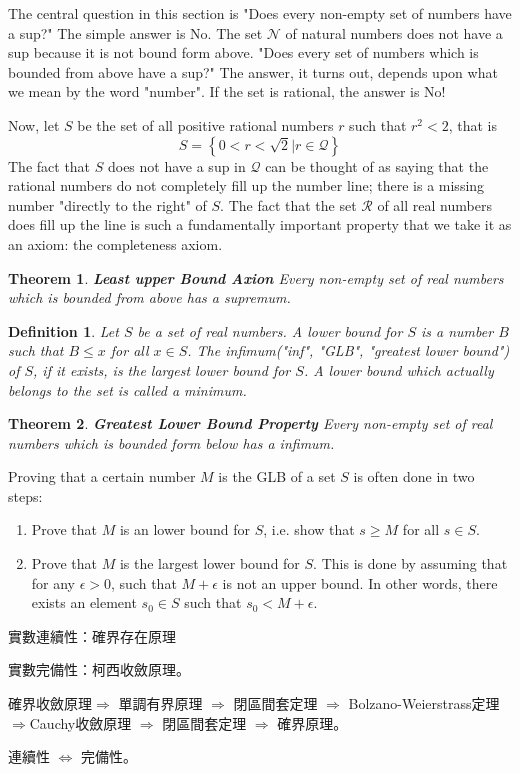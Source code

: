 \documentclass[a4paper,12pt]{article} %
\newtheorem{definition}{Definition}[section]
\newtheorem{theorem}{Theorem}[section]
\begin{document}
The central question in this section is "Does every non-empty set 
of numbers have a sup?" The simple answer is No. The set $\mathcal{N}$
of natural numbers does not have a sup because it is not bound form above. "Does every set of numbers which is bounded from above have a sup?"
The answer, it turns out, depends upon what we mean by the word "number".
If the set is rational, the answer is No!

Now, let $S$ be the set of all positive rational numbers $r$ such that 
$r^2 < 2$, that is 
\[
    S = \left\{0 < r < \sqrt{2} \left| r \in \mathcal{Q} \right.\right\}
\]
The fact that $S$ does not have a sup in $\mathcal{Q}$ can be thought 
of as saying that the rational numbers do not completely fill up the 
number line; there is a missing number "directly to the right" of $S$.
The fact that the set $\mathcal{R}$ of all real numbers does fill up 
the line is such a fundamentally important property that we take it as 
an axiom: the completeness axiom.

\begin{theorem}\textbf{Least upper Bound Axion}
    Every non-empty set of real numbers which is bounded from above has a supremum.
\end{theorem}

\begin{definition}
    Let $S$ be a set of real numbers. A lower bound for $S$ is a number $B$ such that $B \le x$ for all $x \in S$. The infimum("inf", "GLB", 
    "greatest lower bound") of $S$, if it exists, is the largest lower bound for $S$. A lower bound which actually belongs to the set is 
    called a minimum.
\end{definition}

\begin{theorem}\textbf{Greatest Lower Bound Property}
    Every non-empty set of real numbers which is bounded form below 
    has a infimum.
\end{theorem}

Proving that a certain number $M$ is the GLB of a set $S$ is often 
done in two steps:
\begin{enumerate}
    \item Prove that $M$ is an lower bound for $S$, i.e. show that 
        $s \ge M$ for all $s \in S$.
    \item Prove that $M$ is the largest lower bound for $S$. This is 
        done by assuming that for any $\epsilon >0$, such that $M + 
        \epsilon$ is not an upper bound. In other words, there 
        exists an element $s_0 \in S$ such that $s_0 < M + \epsilon$.
\end{enumerate}

\begin{CJK*}{UTF8}{bsmi}
    實數連續性：確界存在原理

    實數完備性：柯西收斂原理。

    確界收斂原理$\Rightarrow $ 單調有界原理 $\Rightarrow$
    閉區間套定理 $\Rightarrow$ Bolzano-Weierstrass定理 $\Rightarrow $Cauchy收斂原理
    $\Rightarrow$ 閉區間套定理 $\Rightarrow$ 確界原理。
    
    連續性 $\iff$ 完備性。
\end{CJK*}
\end{document}
